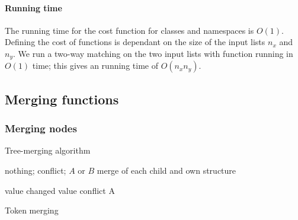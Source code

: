 \documentclass[11pt]{article}
\begin{document}
\paragraph{Running time} The running time for the cost function for classes and namespaces is $O(1)$. Defining the cost of functions is dependant on the size of the input lists $n_x$ and $n_y$. We run a two-way matching on the two input lists with function running in $O(1)$ time; this gives an running time of $O(n_x n_y)$.

\subsection{Merging functions}

\label{MergingFunction}
\subsubsection{Merging nodes}
\begin{algorithm}
\caption{Tree-merging algorithm}
\label{MergeNode}
\begin{algorithmic}
            \State \Return nothing;
        \Else
            \State \Return conflict;
        \EndIf
    \EndIf
        \State \Return $A$ or $B$
    \EndIf
        \State \Return merge of each child and own structure
    \EndIf
        \State \Return {}
    \EndIf
        \State \Return {}
    \EndIf
        \State \Return {}
    \EndIf
\EndFunction
\end{algorithmic}
\end{algorithm}


\begin{algorithm}
\begin{algorithmic}
        \State \Return value
    \EndIf
        \State \Return changed value
    \EndIf
            \State \Return conflict
	    \EndIf
        \State \Return A
    \EndIf
\EndFunction
\end{algorithmic}
  \caption{Token merging}
  \label{MergeToken}
\end{algorithm}
\end{document}
